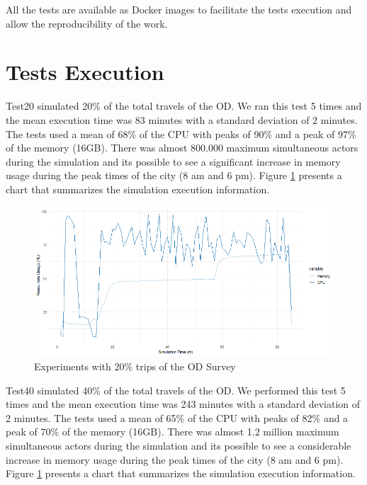 All the tests are available as Docker \citep{merkel2014docker} images to facilitate the tests execution and allow the reproducibility of the work.

\section{Tests Execution}
\label{sec:tests_executions}

Test20 simulated 20\% of the total travels of the OD. We ran this test 5 times and the mean execution time was 83 minutes with a standard deviation of 2 minutes. The tests used a mean of 68\% of the CPU with peaks of 90\% and a peak of 97\% of the memory (16GB). There was almost 800.000 maximum simultaneous actors during the simulation and its possible to see a significant increase in memory usage during the peak times of the city (8 am and 6 pm). Figure \ref{fig:exp20} presents a chart that summarizes the simulation execution information. 

\begin{figure}[!htb]
\centering
\includegraphics[width=1\textwidth]{figuras/chap-exp/experiment20.png}
\caption{Experiments with 20\% trips of the OD Survey}
\label{fig:exp20}
\end{figure}

Test40 simulated 40\% of the total travels of the OD. We performed this test 5 times and the mean execution time was 243 minutes with a standard deviation of 2 minutes. The tests used a mean of 65\% of the CPU with peaks of 82\% and a peak of 70\% of the memory (16GB). There was almost 1.2 million maximum simultaneous actors during the simulation and its possible to see a considerable increase in memory usage during the peak times of the city (8 am and 6 pm). Figure \ref{fig:exp20} presents a chart that summarizes the simulation execution information. 


